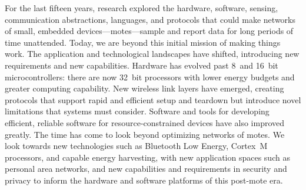 
For the last fifteen years, research explored the hardware, software, sensing,
communication abstractions, languages, and protocols that could make networks
of small, embedded devices---motes---sample and report data for long periods
of time unattended.
%
Today, we are beyond this initial mission of making things work. The
application and technological landscapes have shifted, introducing new
requirements and new capabilities. Hardware has evolved past 8~and 16~bit
microcontrollers: there are now 32~bit processors with lower energy budgets
and greater computing capability. New wireless link layers have
emerged, creating protocols that support rapid and efficient setup and
teardown but introduce novel limitations that systems must consider.
Software and tools for developing efficient, reliable software for
resource-constrained devices have also improved greatly.
%
The time has come to look beyond optimizing networks of motes. We look towards
new technologies such as Bluetooth Low Energy, Cortex~M processors, and
capable energy harvesting, with new application spaces such as personal area
networks, and new capabilities and requirements in security and privacy to
inform the hardware and software platforms of this post-mote era.

